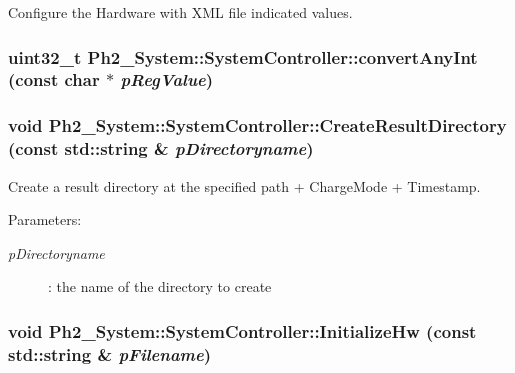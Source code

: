Configure the Hardware with XML file indicated values. 

\hypertarget{class_ph2___system_1_1_system_controller_ce581fac29aed64061574d5b6c2ab235}{
\subsubsection[convertAnyInt]{\setlength{\rightskip}{0pt plus 5cm}uint32\_\-t Ph2\_\-System::System\-Controller::convert\-Any\-Int (const char $\ast$ {\em p\-Reg\-Value})}}
\label{class_ph2___system_1_1_system_controller_ce581fac29aed64061574d5b6c2ab235}


\hypertarget{class_ph2___system_1_1_system_controller_6ad8f5935f511aa28e66364182e6a38d}{
\subsubsection[CreateResultDirectory]{\setlength{\rightskip}{0pt plus 5cm}void Ph2\_\-System::System\-Controller::Create\-Result\-Directory (const std::string \& {\em p\-Directoryname})}}
\label{class_ph2___system_1_1_system_controller_6ad8f5935f511aa28e66364182e6a38d}


Create a result directory at the specified path + Charge\-Mode + Timestamp. 

\begin{Desc}
\item[Parameters:]
\begin{description}
\item[{\em p\-Directoryname}]: the name of the directory to create \end{description}
\end{Desc}
\hypertarget{class_ph2___system_1_1_system_controller_c8288e41f0375b7b9fa21905dd862124}{
\subsubsection[InitializeHw]{\setlength{\rightskip}{0pt plus 5cm}void Ph2\_\-System::System\-Controller::Initialize\-Hw (const std::string \& {\em p\-Filename})}}
\label{class_ph2___system_1_1_system_controller_c8288e41f0375b7b9fa21905dd862124}



